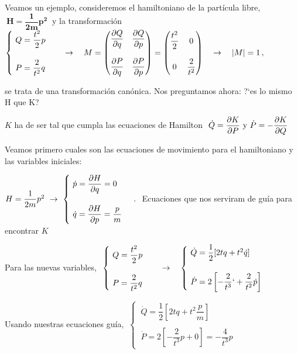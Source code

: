 Veamos un ejemplo, consideremos el hamiltoniano de la partícula libre, $\ \boldsymbol{ H=\dfrac 1 {2m} p^2} \ $ y la transformación $\begin{cases} \ Q=\dfrac {t^2} 2 p \\ \\ \ P=\dfrac 2 {t^2} q \end{cases} \quad  \to \quad \displaystyle M=\mqty( \displaystyle \pdv{Q}{q} & \displaystyle \pdv{Q}{p} \\ \\\displaystyle \pdv{P}{q} & \displaystyle \pdv{P}{p} )=\mqty(\dfrac {t^2} 2 & 0 \\ \\ 0 & \dfrac 2 {t^2}) \quad \to \quad |M|=1\, , \ $ 

se trata de una transformación canónica. Nos preguntamos ahora: ?`es lo mismo H que K?

$K$  ha de ser tal que cumpla las ecuaciones de Hamilton $\ \dot Q =\displaystyle \pdv{K}{P} \text{ y } \dot P=-\pdv{K}{Q}$

Veamos primero cuales son las ecuaciones de movimiento para el hamiltoniano y las variables iniciales:

$H=\dfrac 1{2m} p^2 \ \to \ \begin{cases} \ \dot p=\displaystyle \pdv{H}{q}=0 \\ \\ \ \displaystyle \dot q=\pdv{H}{p}=\dfrac p m \end{cases}\, . \ $ Ecuaciones que nos serviram de guía para encontrar $K$

Para las nuevas variables, $\ \begin{cases} \ Q=\dfrac {t^2} 2 p \\ \\ \ P=\dfrac 2 {t^2} q \end{cases} \quad  \to \quad \begin{cases} \ \dot Q=\dfrac 1 2 [2tq+t^2 \dot q] \\ \\ \ \dot P=2\left[ -\dfrac 2 {t^3} `+ \dfrac 2 {t^2} \dot p \right] \end{cases}$

Usando nuestras ecuaciones guía, $\ \begin{cases} \ \dot Q = \dfrac 1 2 \left[ 2tq+t^2 \dfrac p m \right] \\ \\ \ \dot P = 2 \left[ -\dfrac 2 {t^3} p + 0 \right]=-\dfrac 4 {t^3} p \end{cases}$

